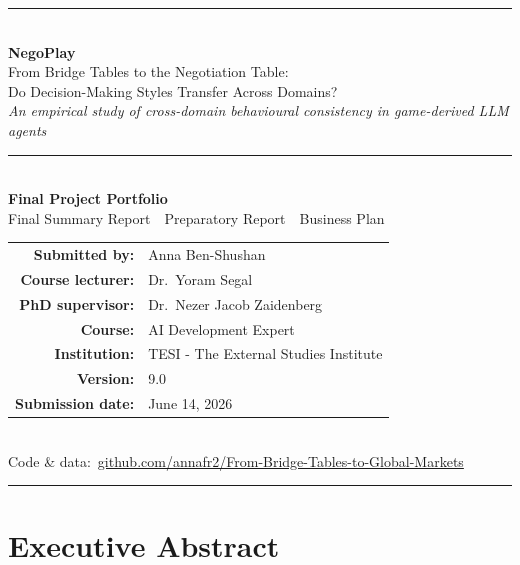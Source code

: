 \documentclass[11pt, a4paper, oneside, openany]{report}
\begin{document}
\begin{titlepage}
\centering
\vspace*{1.8cm}
{\color{navy}\rule{\textwidth}{1.2pt}}\\[1.2cm]
{\Huge\bfseries\color{navy} NegoPlay\\[0.45cm]}
{\Large From Bridge Tables to the Negotiation Table:\\
Do Decision-Making Styles Transfer Across Domains?\\[0.6cm]}
{\normalsize\itshape An empirical study of cross-domain behavioural
consistency in game-derived LLM agents\\[1.0cm]}
{\color{navy}\rule{0.6\textwidth}{0.6pt}}\\[1.4cm]
{\large \textbf{Final Project Portfolio}\\
Final Summary Report \,\textperiodcentered\, Preparatory Report \,\textperiodcentered\, Business Plan\\[1.8cm]}
\begin{tabular}{rl}
\textbf{Submitted by:} & Anna Ben-Shushan \\[6pt]
\textbf{Course lecturer:} & Dr.\ Yoram Segal \\[6pt]
\textbf{PhD supervisor:} & Dr.\ Nezer Jacob Zaidenberg \\[6pt]
\textbf{Course:} & AI Development Expert \\[6pt]
\textbf{Institution:} & TESI - The External Studies Institute \\[6pt]
\textbf{Version:} & 9.0 \\[6pt]
\textbf{Submission date:} & June 14, 2026 \\
\end{tabular}\\[1.1cm]
{\small Code \& data:\ \href{https://github.com/annafr2/From-Bridge-Tables-to-Global-Markets}{\color{steel}github.com/annafr2/From-Bridge-Tables-to-Global-Markets}}\\[1.1cm]
{\color{navy}\rule{\textwidth}{1.2pt}}
\vfill
\end{titlepage}

\chapter*{Executive Abstract}
\end{document}
